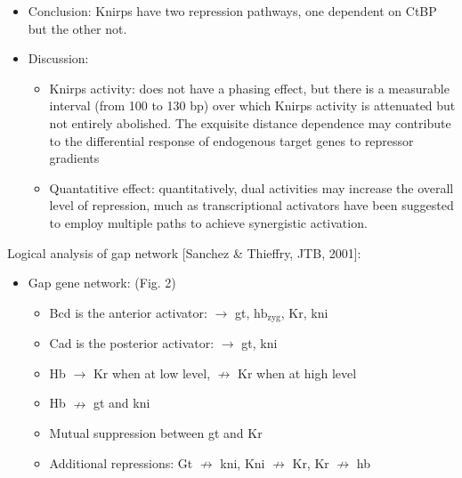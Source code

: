 \documentclass{report}
\begin{document}
\begin{enumerate}
\begin{itemize}
		\item Conclusion: Knirps have two repression pathways, one dependent on CtBP but the other not. 
		
		\item Discussion: 
		\begin{itemize}
			\item Knirps activity: does not have a phasing effect, but there is a measurable interval (from 100 to 130 bp) over which Knirps activity is attenuated but not entirely abolished. The exquisite distance dependence may contribute to the differential response of endogenous target genes to repressor gradients
			\item Quantatitive effect: quantitatively, dual activities may increase the overall level of repression, much as transcriptional activators have been suggested to employ multiple paths to achieve synergistic activation.
		\end{itemize}
	\end{itemize}
	
	Logical analysis of gap network [Sanchez \& Thieffry, JTB, 2001]:
	\begin{itemize}
		\item Gap gene network: (Fig. 2)
		\begin{itemize}
			\item Bcd is the anterior activator: $\rightarrow$ gt, $\text{hb}_{\text{zyg}}$, Kr, kni
			\item Cad is the posterior activator: $\rightarrow$ gt, kni
			\item Hb $\rightarrow$ Kr when at low level, $\nrightarrow$ Kr when at high level
			\item Hb $\nrightarrow$ gt and kni
			\item Mutual suppression between gt and Kr
			\item Additional repressions: Gt $\nrightarrow$ kni, Kni $\nrightarrow$ Kr, Kr $\nrightarrow$ hb
		\end{itemize}
		

\end{itemize}
\end{enumerate}
\end{document}
